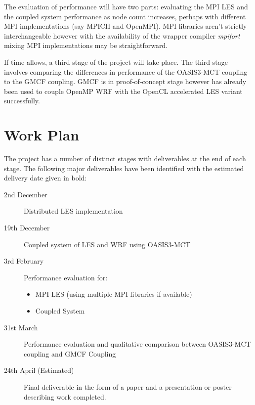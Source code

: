 \documentclass{acm_proc_article-sp}
\renewcommand{\_}{\underscore\hspace{0pt}}
\begin{document}
The evaluation of performance will have two parts: evaluating the MPI LES and
the coupled system performance as node count increases, perhaps with different
MPI implementations (say MPICH and OpenMPI). MPI libraries aren't strictly
interchangeable however with the availability of the wrapper compiler
\textit{mpifort} mixing MPI implementations may be straightforward.

If time allows, a third stage of the project will take place. The third stage
involves comparing the differences in performance of the OASIS3-MCT coupling to
the GMCF coupling. GMCF is in proof-of-concept stage however has already been
used to couple OpenMP WRF with the OpenCL accelerated LES variant successfully.

\section*{Work Plan}

The project has a number of distinct stages with deliverables at the end of each
stage. The following major deliverables have been identified with the estimated
delivery date given in bold:

\begin{description}
	\item[2nd December] Distributed LES implementation
	\item[19th December] Coupled system of LES and WRF using OASIS3-MCT
	\item[3rd February] Performance evaluation for:
    \begin{itemize}
        \item MPI LES (using multiple MPI libraries if available)
        \item Coupled System
    \end{itemize}
	\item[31st March] Performance evaluation and qualitative comparison between
    OASIS3-MCT coupling and GMCF Coupling
    \item[24th April (Estimated)] Final deliverable in the form of a paper and a
    presentation or poster describing work completed.
\end{description}



\end{document}
